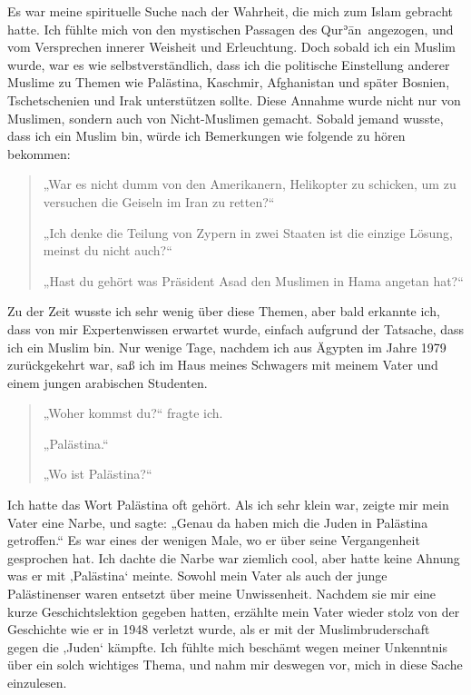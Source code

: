 \documentclass[12pt]{memoir}
\def\´{ʾ} %
\def \Quran{Qur\-\´ān} %
\def\–{\hskip0pt-\hskip0pt}
\begin{document}
Es war meine spirituelle Suche nach der Wahrheit,
die mich zum Islam gebracht hatte.
Ich fühlte mich von den mystischen Passagen des \Quran\ angezogen,
und vom Versprechen innerer Weisheit und Erleuchtung.
Doch sobald ich ein Muslim wurde, war es wie selbstverständlich,
dass ich die politische Einstellung anderer Muslime
zu Themen wie Palästina, Kaschmir, Afghanistan
und später Bosnien, Tschetschenien und Irak unterstützen sollte.
Diese Annahme wurde nicht nur von Muslimen,
sondern auch von Nicht\–Muslimen gemacht.
Sobald jemand wusste, dass ich ein Muslim bin,
würde ich Bemerkungen wie folgende zu hören bekommen:

\begin{quote}
„War es nicht dumm von den Amerikanern, Helikopter zu schicken,
um zu versuchen die Geiseln im Iran zu retten?“

„Ich denke die Teilung von Zypern in zwei Staaten ist die einzige Lösung,
meinst du nicht auch?“

„Hast du gehört was Präsident Asad den Muslimen in Hama angetan hat?“
\end{quote}

Zu der Zeit wusste ich sehr wenig über diese Themen,
aber bald erkannte ich, dass von mir Expertenwissen erwartet wurde,
einfach aufgrund der Tatsache, dass ich ein Muslim bin.
Nur wenige Tage, nachdem ich aus Ägypten im Jahre 1979 zurückgekehrt war,
saß ich im Haus meines Schwagers mit meinem Vater
und einem jungen arabischen Studenten.

\begin{quote}
„Woher kommst du?“ fragte ich.

„Palästina.“

„Wo ist Palästina?“
\end{quote}

Ich hatte das Wort Palästina oft gehört.
Als ich sehr klein war, zeigte mir mein Vater eine Narbe, und sagte:
„Genau da haben mich die Juden in Palästina getroffen.“
Es war eines der wenigen Male, wo er über seine Vergangenheit gesprochen hat.
Ich dachte die Narbe war ziemlich cool,
aber hatte keine Ahnung was er mit ‚Palästina‘ meinte.
Sowohl mein Vater als auch der junge Palästinenser
waren entsetzt über meine Unwissenheit.
Nachdem sie mir eine kurze Geschichtslektion gegeben hatten,
erzählte mein Vater wieder stolz von der Geschichte
wie er in 1948 verletzt wurde,
als er mit der Muslimbruderschaft gegen die ‚Juden‘ kämpfte.
Ich fühlte mich beschämt wegen meiner Unkenntnis
über ein solch wichtiges Thema,
und nahm mir deswegen vor, mich in diese Sache einzulesen.
\end{document}
